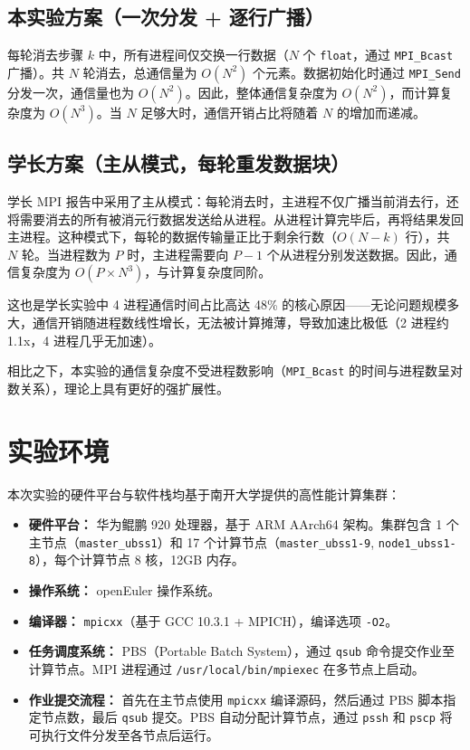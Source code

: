 \documentclass[a4paper]{article}
\begin{document}
\subsection{本实验方案（一次分发 + 逐行广播）}

每轮消去步骤 $k$ 中，所有进程间仅交换一行数据（$N$ 个 \texttt{float}，通过 \texttt{MPI\_Bcast} 广播）。共 $N$ 轮消去，总通信量为 $O(N^2)$ 个元素。数据初始化时通过 \texttt{MPI\_Send} 分发一次，通信量也为 $O(N^2)$。因此，整体通信复杂度为 $O(N^2)$，而计算复杂度为 $O(N^3)$。当 $N$ 足够大时，通信开销占比将随着 $N$ 的增加而递减。

\subsection{学长方案（主从模式，每轮重发数据块）}

学长 MPI 报告中采用了主从模式：每轮消去时，主进程不仅广播当前消去行，还将需要消去的所有被消元行数据发送给从进程。从进程计算完毕后，再将结果发回主进程。这种模式下，每轮的数据传输量正比于剩余行数（$O(N-k)$ 行），共 $N$ 轮。当进程数为 $P$ 时，主进程需要向 $P-1$ 个从进程分别发送数据。因此，通信复杂度为 $O(P \times N^3)$，与计算复杂度同阶。

这也是学长实验中 4 进程通信时间占比高达 48\% 的核心原因——无论问题规模多大，通信开销随进程数线性增长，无法被计算摊薄，导致加速比极低（2 进程约 1.1x，4 进程几乎无加速）。

相比之下，本实验的通信复杂度不受进程数影响（\texttt{MPI\_Bcast} 的时间与进程数呈对数关系），理论上具有更好的强扩展性。

\section{实验环境}

本次实验的硬件平台与软件栈均基于南开大学提供的高性能计算集群：

\begin{itemize}
    \item \textbf{硬件平台：} 华为鲲鹏 920 处理器，基于 ARM AArch64 架构。集群包含 1 个主节点（\texttt{master\_ubss1}）和 17 个计算节点（\texttt{master\_ubss1-9}, \texttt{node1\_ubss1-8}），每个计算节点 8 核，12GB 内存。
    \item \textbf{操作系统：} openEuler 操作系统。
    \item \textbf{编译器：} \texttt{mpicxx}（基于 GCC 10.3.1 + MPICH），编译选项 \texttt{-O2}。
    \item \textbf{任务调度系统：} PBS（Portable Batch System），通过 \texttt{qsub} 命令提交作业至计算节点。MPI 进程通过 \texttt{/usr/local/bin/mpiexec} 在多节点上启动。
    \item \textbf{作业提交流程：} 首先在主节点使用 \texttt{mpicxx} 编译源码，然后通过 PBS 脚本指定节点数，最后 \texttt{qsub} 提交。PBS 自动分配计算节点，通过 \texttt{pssh} 和 \texttt{pscp} 将可执行文件分发至各节点后运行。
\end{itemize}
\end{document}
